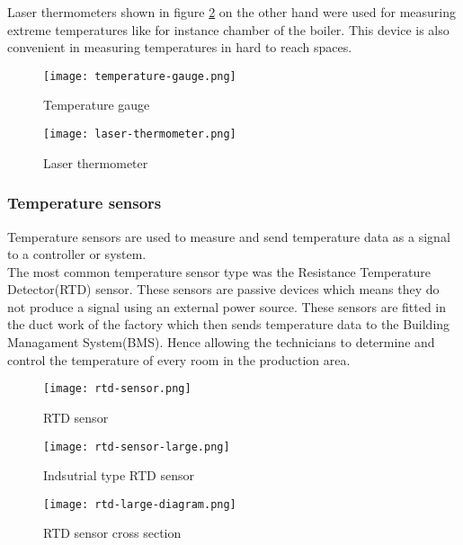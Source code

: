 \documentclass[a4paper,12pt]{article}
\begin{document}
					Laser thermometers shown in figure \ref{fig:laser-thermometer} on the other hand were used for measuring extreme temperatures like for instance chamber of the boiler.
					This device is also convenient in measuring temperatures in hard to reach spaces. 
					
						\begin{figure}[H]
							\centering				
							\texttt{[image: temperature-gauge.png]}
							\caption{Temperature gauge}
							\label{fig:temperature-gauge}
						\end{figure}
						
						\begin{figure}[H]
							\centering				
							\texttt{[image: laser-thermometer.png]}
							\caption{Laser thermometer}
							\label{fig:laser-thermometer}
						\end{figure}
						
				\subsubsection*{Temperature sensors}
					Temperature sensors are used to measure and send temperature data as a signal to a controller or system.\\
					The most common temperature sensor type was the Resistance Temperature Detector(RTD) sensor.
					These sensors are passive devices which means they do not produce a signal using an external power source.
					These sensors are fitted in the duct work of the factory which then sends temperature data to the Building Managament System(BMS).
					Hence allowing the technicians to determine and control the temperature of every room in the production area.      
						\begin{figure}[H]
							\centering			
							\texttt{[image: rtd-sensor.png]}
							\caption{RTD sensor}
							\label{fig:rtd-sensor}
						\end{figure}
						
						\begin{figure}[H]
							\centering				
							\texttt{[image: rtd-sensor-large.png]}
							\caption{Indsutrial type RTD sensor}
							\label{fig:rtd-sensor-large}
						\end{figure}
						
						\begin{figure}[H]
							\centering			
							\texttt{[image: rtd-large-diagram.png]}
							\caption{RTD sensor cross section}
							\label{fig:rtd-sensor-diagram}
						\end{figure}
															
\end{document}
